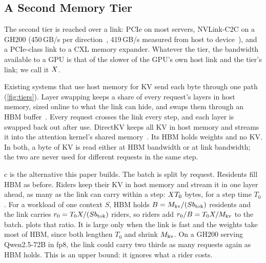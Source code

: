 \subsection{A Second Memory Tier}

The second tier is reached over a link: PCIe on most servers, NVLink-C2C on a
GH200 (450\,GB/s per direction~\cite{gh200page,directkv}, 419\,GB/s measured
from host to device~\cite{pie}), and a PCIe-class link to a CXL memory
expander. Whatever the tier, the bandwidth available to a GPU is that of the
slower of the GPU's own host link and the tier's link; we call it $X$.



Existing systems that use host memory for KV send each byte through one path
(\cref{fig:tiers}). Layer swapping keeps a share of every request's layers in
host memory, sized online to what the link can hide, and swaps them through
an HBM buffer~\cite{pie}. Every request crosses the link every step, and each layer is
swapped back out after use. DirectKV keeps all KV in host memory and streams it into the
attention kernel's shared memory~\cite{directkv}. Its HBM holds weights and
no KV. In both, a byte of KV is read either at HBM bandwidth or at link
bandwidth; the two are never used for different requests in the same step.



c is the alternative this paper builds. The batch is split by
request. Residents fill HBM as before. Riders keep their KV in host memory and
stream it in one layer ahead, as many as the link can carry within a step:
$X T_0$ bytes, for a step time $T_0$. For a workload of one context $S$,
HBM holds $B = M_{\mathrm{kv}}/(Sb_{\mathrm{tok}})$ residents and the link carries
$r_0 = T_0X/(Sb_{\mathrm{tok}})$ riders, so riders add
$r_0/B = T_0X/M_{\mathrm{kv}}$ to the batch.  plots that
ratio. It is large only when the link is fast and the weights take most of
HBM, since both lengthen $T_0$ and shrink $M_{\mathrm{kv}}$. On a GH200 serving
Qwen2.5-72B in fp8, the link could carry two thirds as many requests again as
HBM holds. This is an upper bound: it ignores what a rider costs.

